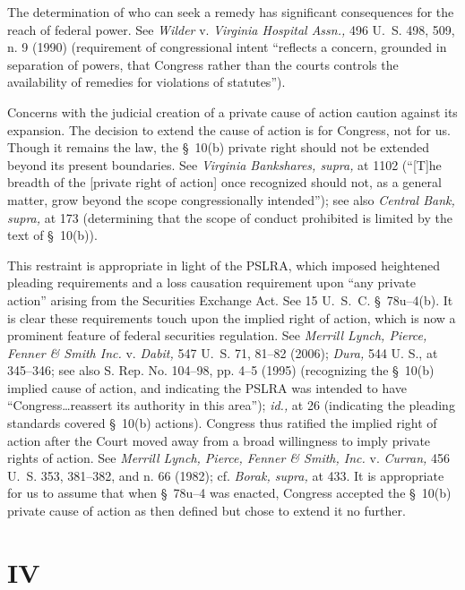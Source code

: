 \noindent The determination of who can seek a remedy has significant consequences for the reach of federal power. See \emph{Wilder} v. \emph{Virginia Hospital Assn.,} 496 U.~S. 498, 509, n. 9 (1990) (requirement of congressional intent ``reflects a concern, grounded in separation of powers, that Congress rather than the courts controls the availability of remedies for violations of statutes'').

  Concerns with the judicial creation of a private cause of action caution against its expansion. The decision to extend the cause of action is for Congress, not for us. Though it remains the law, the \S~10(b) private right should not be extended beyond its present boundaries. See \emph{Virginia Bankshares, supra,} at 1102 (``[T]he breadth of the [private right of action] once recognized should not, as a general matter, grow beyond the scope congressionally intended''); see also \emph{Central Bank, supra,} at 173 (determining that the scope of conduct prohibited is limited by the text of \S~10(b)).

  This restraint is appropriate in light of the PSLRA, which imposed heightened pleading requirements and a loss causation requirement upon ``any private action'' arising from the Securities Exchange Act. See 15 U.~S.~C. \S~78u--4(b). It is clear these requirements touch upon the implied right of action, which is now a prominent feature of federal securities regulation. See \emph{Merrill Lynch, Pierce, Fenner \& Smith Inc.} v. \emph{Dabit,} 547 U.~S. 71, 81--82 (2006); \emph{Dura,} 544 U. S., at 345--346; see also S. Rep. No. 104--98, pp. 4--5 (1995) (recognizing the \S~10(b) implied cause of action, and indicating the PSLRA was intended to have ``Congress\dots reassert its authority in this area''); \emph{id.,} at 26 (indicating the pleading standards covered \S~10(b) actions). Congress thus ratified the implied right of action after the Court moved away from a broad willingness to imply private rights of action. See \newpage  \emph{Merrill Lynch, Pierce, Fenner \& Smith, Inc.} v. \emph{Curran,} 456 U.~S. 353, 381--382, and n. 66 (1982); cf. \emph{Borak, supra,} at 433. It is appropriate for us to assume that when \S~78u--4 was enacted, Congress accepted the \S~10(b) private cause of action as then defined but chose to extend it no further.

\section{IV}

